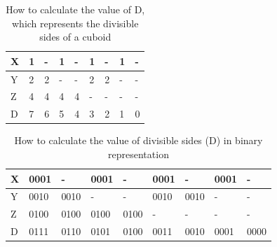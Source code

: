 \documentclass{subfiles}
\begin{document}
\begin{table}[!htbp]
	\renewcommand{\arraystretch}{1.3}
	\centering
		\begin{tabular}{|P{0.7cm}||P{0.7cm}|P{0.7cm}|P{0.7cm}|P{0.7cm}|P{0.7cm}|P{0.7cm}|P{0.7cm}|P{0.7cm}|}	
		\hline
		X &	1 &	- &	1 &	- &	1 &	- &	1 &	- \\	
		\hline
		Y &	2 &	2 &	- &	- &	2 &	2 &	- &	- \\
		\hline
		Z &	4 &	4 &	4 &	4 &	- &	- &	- &	- \\
		\hline
		D &	7 &	6 &	5 &	4 &	3 &	2 &	1 &	0 \\
		\hline
	\end{tabular}
	\caption{How to calculate the value of D, which represents the divisible sides of a cuboid}
	\label{tab:Dnumbers}
\end{table}


\begin{table}[!htbp]
	\renewcommand{\arraystretch}{1.3}
	\centering
	
	\begin{tabular}{|P{0.7cm}||P{0.7cm}|P{0.7cm}|P{0.7cm}|P{0.7cm}|P{0.7cm}|P{0.7cm}|P{0.7cm}|P{0.7cm}|}
		\hline
		X &	0001 &	-	 &	0001 &	-	 &	0001 &	-	 &	0001 &	-   \\
		\hline
		Y &	0010 &	0010 &	-	 &	-	 &	0010 &	0010 &	-	 &	-   \\
		\hline
		Z &	0100 &	0100 &	0100 &	0100 &	-	 &	-	 &	-	 &	-   \\
		\hline
		D &	0111 &	0110 &	0101 &	0100 &	0011 &	0010 &	0001 &	0000\\
		\hline
	\end{tabular}
	
	\caption{How to calculate the value of divisible sides (D) in binary representation}
	\label{tab:Dbinary}
\end{table}
\end{document}
